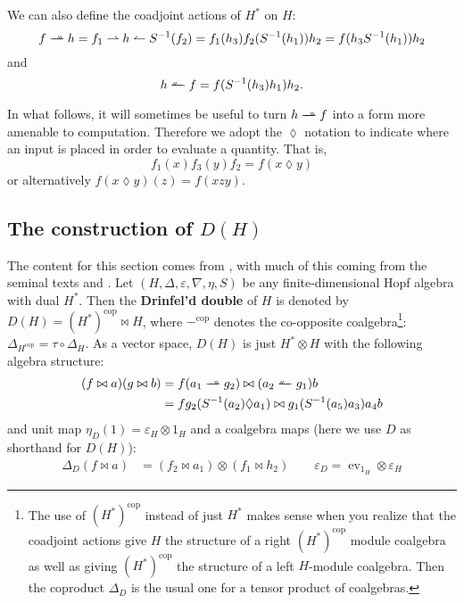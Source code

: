 \documentclass [11pt, proquest] {uwthesis}[2020/02/24]
\newcommand{\doubleharpoonright}{%
  \rightharpoonup\mathrel{\mspace{-15mu}}\rightharpoonup
}
\newcommand{\doubleharpoonleft}{%
  \leftharpoonup\mathrel{\mspace{-15mu}}\leftharpoonup
}
\begin{document}
    We can also define the coadjoint actions of $H^\ast$ on $H$:
    \[f\doubleharpoonright h = f_1\rightharpoonup h \leftharpoonup S^{-1}(f_2)=f_1(h_3)f_2(S^{-1}(h_{1}))h_{2}=f(h_3S^{-1}(h_1))h_2\]
    and 
    \[h\doubleharpoonleft f = f(S^{-1}(h_3)h_1)h_2.\]
    
    In what follows, it will sometimes be useful to turn $h\doubleharpoonright f$ into a form more amenable to computation. Therefore we adopt the $\lozenge$ notation to indicate where an input is placed in order to evaluate a quantity. That is,
    \[f_1(x) f_3(y)f_2=f(x\lozenge y)\]
    or alternatively $f(x\lozenge y)(z)=f(xzy).$
    
    
\subsection{The construction of \texorpdfstring{$D(H)$}{D(H)}}
    The content for this section comes from \cite{montgomery}, with much of this coming from the seminal texts \cite{drinfeld86} and \cite{majid-double90}.
    Let $(H,\Delta,\varepsilon,\nabla,\eta,S)$ be any finite-dimensional Hopf algebra with dual $H^\ast.$ Then the \textbf{Drinfel'd double} of $H$ is denoted by $D(H)=(H^{\ast})^{\text{cop}}\bowtie H$, where $-^\text{cop}$ denotes the co-opposite coalgebra\footnote{The use of $(H^\ast)^\text{cop}$ instead of just $H^\ast$ makes sense when you realize that the coadjoint actions give $H$ the structure of a right $(H^\ast)^\text{cop}$ module coalgebra as well as giving $(H^\ast)^\text{cop}$ the structure of a left $H$-module coalgebra. Then the coproduct $\Delta_D$ is the usual one for a tensor product of coalgebras.}: $\Delta_{H^\text{cop}} = \tau\circ \Delta_H.$ As a vector space, $D(H)$ is just $H^\ast\otimes H$ with the following algebra structure:
    \begin{align*}
        (f\bowtie a)(g\bowtie b)&=f(a_1\doubleharpoonright g_2)\bowtie (a_2\doubleharpoonleft g_1)b\\
        &= f g_2(S^{-1}(a_{2})\lozenge a_{1})\bowtie g_1(S^{-1}(a_{5})a_{3})a_{4}b
    \end{align*}
    and unit map $\eta_D(1)=\varepsilon_H\otimes 1_H$ and a coalgebra maps (here we use $D$ as shorthand for $D(H)$):
    \begin{align*}
        \Delta_D(f\bowtie a) &= (f_2\bowtie a_1)\otimes (f_1\bowtie h_2)\qquad \varepsilon_D=\operatorname{ev}_{1_H}\otimes \varepsilon_H
    \end{align*}
    
\end{document}
